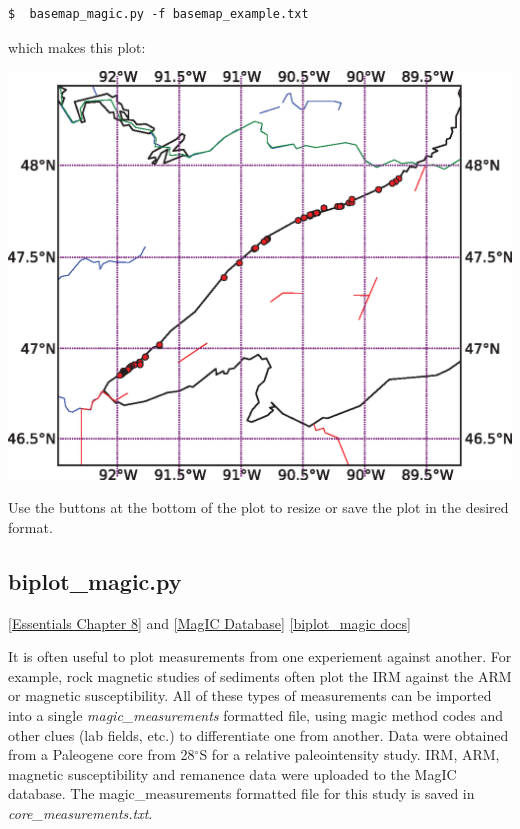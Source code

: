 \documentclass[11pt]{book}
\begin{document}
{{\begin{verbatim}
$  basemap_magic.py -f basemap_example.txt
\end{verbatim}

\noindent which makes this plot:

\includegraphics[width=15cm]{EPSfiles/basemap.eps}

  Use the buttons at the bottom of the plot to resize or save the plot in the desired format.



\subsection{biplot\_magic.py}
\label{ex:biplot_magic}
\href{http://earthref.org/MAGIC/books/Tauxe/Essentials/WebBook3ch8.html#ch8}{
[Essentials Chapter 8]} and \href{#MagICDatabase}{[MagIC Database]}
\href{https://github.com/PmagPy/PmagPy/blob/master/programs/biplot_magic.py}{[biplot\_magic docs]}

It is often useful to plot measurements from one experiement against another.  For example, rock magnetic studies of sediments often plot the IRM against the ARM or magnetic susceptibility.  All of these types of measurements can be imported into a single {\it magic\_measurements} formatted file, using magic method codes and other clues (lab fields, etc.) to differentiate one from another.
Data  were obtained from a Paleogene core from 28$^{\circ}$S for a relative paleointensity study.    IRM, ARM, magnetic susceptibility and remanence data were uploaded to the MagIC database.  The magic\_measurements formatted file for this study is saved in {\it core\_measurements.txt}.

}}
\end{document}
